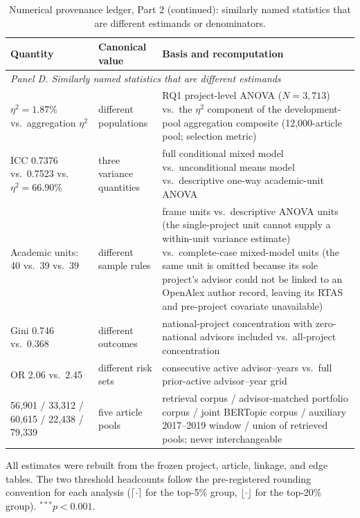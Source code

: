 \documentclass[a4paper,11pt]{article}
\begin{document}
\addtocounter{table}{-1}
\begin{table}[H]
\centering
\caption{Numerical provenance ledger, Part 2 (continued): similarly named statistics that are different estimands or denominators.}
\scriptsize
\begin{tabular}{p{1.55in}p{1.05in}p{3.15in}}
\toprule
\textbf{Quantity} & \textbf{Canonical value} & \textbf{Basis and recomputation}\\
\midrule
\multicolumn{3}{l}{\textit{Panel D. Similarly named statistics that are different estimands}}\\
\midrule
$\eta^2=1.87\%$ vs.\ aggregation $\eta^2$ & different populations & RQ1 project-level ANOVA ($N=3{,}713$) vs.\ the $\eta^2$ component of the development-pool aggregation composite (12,000-article pool; selection metric)\\
ICC 0.7376 vs.\ 0.7523 vs.\ $\eta^2=66.90\%$ & three variance quantities & full conditional mixed model vs.\ unconditional means model vs.\ descriptive one-way academic-unit ANOVA\\
Academic units: 40 vs.\ 39 vs.\ 39 & different sample rules & frame units vs.\ descriptive ANOVA units (the single-project unit cannot supply a within-unit variance estimate) vs.\ complete-case mixed-model units (the same unit is omitted because its sole project's advisor could not be linked to an OpenAlex author record, leaving its RTAS and pre-project covariate unavailable)\\
Gini 0.746 vs.\ 0.368 & different outcomes & national-project concentration with zero-national advisors included vs.\ all-project concentration\\
OR 2.06 vs.\ 2.45 & different risk sets & consecutive active advisor--years vs.\ full prior-active advisor--year grid\\
56,901 / 33,312 / 60,615 / 22,438 / 79,339 & five article pools & retrieval corpus / advisor-matched portfolio corpus / joint BERTopic corpus / auxiliary 2017--2019 window / union of retrieved pools; never interchangeable\\
\bottomrule
\end{tabular}

\vspace{1mm}
\footnotesize All estimates were rebuilt from the frozen project, article, linkage, and edge tables. The two threshold headcounts follow the pre-registered rounding convention for each analysis ($\lceil\cdot\rceil$ for the top-5\% group, $\lfloor\cdot\rfloor$ for the top-20\% group). $^{***}p<0.001$.
\end{table}
\end{document}
